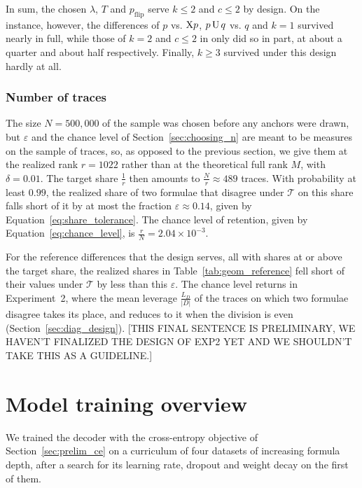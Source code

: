 \documentclass[titlepage,a4paper,11pt]{report}
\begin{document}
    In sum, the chosen $\lambda$, $T$ and $p_{\text{flip}}$ serve $k\le2$ and $c\le2$ by design. On the instance, however, the differences of $p$ vs. $\text{X} p$, $p\,\text{U}\,q$ vs. $q$ and $k=1$ survived nearly in full, while those of $k=2$ and $c\le2$ in only did so in part, at about a quarter and about half respectively. Finally, $k\ge3$ survived under this design hardly at all.

    \subsubsection{Number of traces}\label{sec:geom_sample_size}
    The size $N=500{,}000$ of the sample was chosen before any anchors were drawn, but $\varepsilon$ and the chance level of Section~\ref{sec:choosing_n} are meant to be measures on the sample of traces, so, as opposed to the previous section, we give them at the realized rank $r=1022$ rather than at the theoretical full rank $M$, with $\delta=0.01$. The target share $\frac1r$ then amounts to $\frac Nr\approx489$ traces. With probability at least $0.99$, the realized share of two formulae that disagree under $\mathcal T$ on this share falls short of it by at most the fraction $\varepsilon\approx0.14$, given by  Equation~\eqref{eq:share_tolerance}. The chance level of retention, given by Equation~\eqref{eq:chance_level}, is $\frac rN=2.04\times10^{-3}$.
    
    For the reference differences that the design serves, all with shares at or above the target share, the realized shares in Table~\ref{tab:geom_reference} fell short of their values under $\mathcal T$ by less than this $\varepsilon$. The chance level returns in Experiment~2, where the mean leverage $\frac{L_D}{|D|}$ of the traces on which two formulae disagree takes its place, and reduces to it when the division is even (Section~\ref{sec:diag_design}). [THIS FINAL SENTENCE IS PRELIMINARY, WE HAVEN'T FINALIZED THE DESIGN OF EXP2 YET AND WE SHOULDN'T TAKE THIS AS A GUIDELINE.]


    \section{Model training overview}\label{sec:model_training_overview}
    We trained the decoder with the cross-entropy objective of Section~\ref{sec:prelim_ce} on a curriculum of four datasets of increasing formula depth, after a search for its learning rate, dropout and weight decay on the first of them.
    
\end{document}

